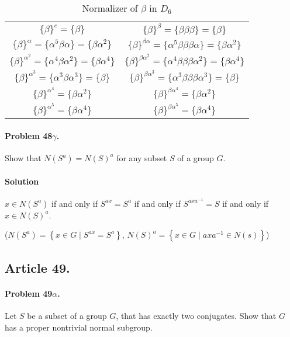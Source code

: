 \begin{table}[ht]
\begin{center}
\begin{tabular}[ht]{cc}
$\{\beta\}^e = \{\beta\}$  &
  $\{\beta\}^\beta = \{\beta \beta \beta\} = \{ \beta \}$ \\
$\{\beta\}^{\alpha} = \{\alpha^5 \beta \alpha\} = \{\beta\alpha^2\}$ 
  &  $\{\beta\}^{\beta\alpha} = \{\alpha^5\beta \beta \beta\alpha\} = \{\beta\alpha^2\}$ \\
$\{\beta\}^{\alpha^2} = \{\alpha^4 \beta \alpha^2\} = \{\beta\alpha^4\}$
  &  $\{\beta\}^{\beta\alpha^2} = \{\alpha^4 \beta \beta \beta \alpha^2\} = \{\beta\alpha^4\}$ \\
$\{\beta\}^{\alpha^3} = \{\alpha^3 \beta \alpha^3\} = \{\beta\}$
  &  $\{\beta\}^{\beta\alpha^3} = \{\alpha^3 \beta \beta \beta \alpha^3\} = \{\beta\}$ \\
$\{\beta\}^{\alpha^4} = \{\beta\alpha^2\}$
  &  $\{\beta\}^{\beta\alpha^4} = \{\beta\alpha^2\}$ \\
$\{\beta\}^{\alpha^5} = \{\beta\alpha^4\}$
  &  $\{\beta\}^{\beta\alpha^5} = \{\beta\alpha^4\}$ \\
\end{tabular}
\end{center}
\caption{Normalizer of $\beta$ in $D_6$}
\label{table:normalizers2_in_d6}
\end{table}

\paragraph{Problem 48$\gamma$.}
Show that $N(S^a) = N(S)^a$ for any subset $S$ of a group $G$.

\paragraph*{Solution}
$x \in N(S^a)$ if and only if $S^{ax} = S^a$ if and only if $S^{axa^{-1}} = S$
if and only if $x \in N(S)^a$.

($N(S^a) = \left\{ x \in G \mid S^{ax} = S^a \right\}$,
$N(S)^a = \left\{ x \in G \mid axa^{-1} \in N(s) \right\}$)

\subsection{Article 49.}

\paragraph{Problem 49$\alpha$.}
Let $S$ be a subset of a group $G$, that has exactly two conjugates. Show that
$G$ has a proper nontrivial normal subgroup.

